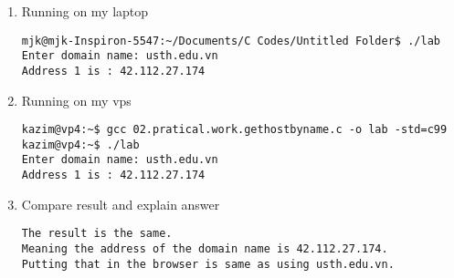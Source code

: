 \documentclass{article}
\begin{document}
\begin{enumerate}

\item Running on my laptop
\begin{verbatim} 
mjk@mjk-Inspiron-5547:~/Documents/C Codes/Untitled Folder$ ./lab
Enter domain name: usth.edu.vn
Address 1 is : 42.112.27.174
\end{verbatim}

\item Running on my vps
\begin{verbatim} 
kazim@vp4:~$ gcc 02.pratical.work.gethostbyname.c -o lab -std=c99
kazim@vp4:~$ ./lab
Enter domain name: usth.edu.vn
Address 1 is : 42.112.27.174
\end{verbatim}

\item Compare result and explain answer
\begin{verbatim} 
The result is the same. 
Meaning the address of the domain name is 42.112.27.174.
Putting that in the browser is same as using usth.edu.vn.
\end{verbatim}

\end{enumerate}
\end{document}
